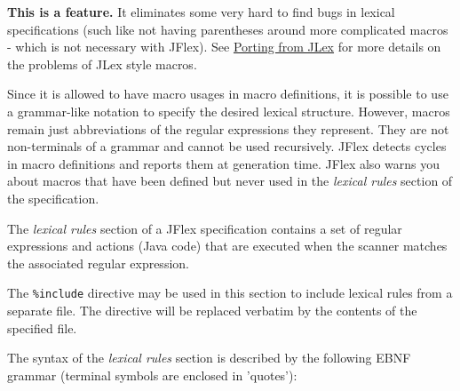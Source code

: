 \textbf{This is a feature.} It eliminates some very hard to find bugs in
lexical specifications (such like not having parentheses around more
complicated macros - which is not necessary with JFlex). See
\hyperref[Porting]{Porting from JLex} for more details on the problems
of JLex style macros.

Since it is allowed to have macro usages in macro definitions, it is
possible to use a grammar-like notation to specify the desired lexical
structure. However, macros remain just abbreviations of the regular
expressions they represent. They are not non-terminals of a grammar and
cannot be used recursively. JFlex detects cycles in macro definitions
and reports them at generation time. JFlex also warns you about macros
that have been defined but never used in the \emph{lexical rules}
section of the specification.


The \emph{lexical rules} section of a JFlex specification contains a set
of regular expressions and actions (Java code) that are executed when
the scanner matches the associated regular expression.

The \texttt{\%include} directive may be used in this section to include
lexical rules from a separate file. The directive will be replaced
verbatim by the contents of the specified file.


The syntax of the \emph{lexical rules} section is described by the
following EBNF grammar (terminal symbols are enclosed in 'quotes'):

